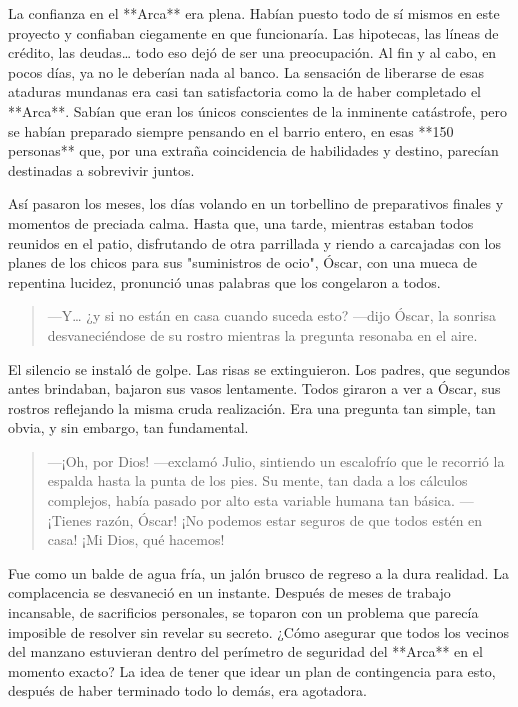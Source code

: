 \documentclass[a4paper,12pt]{book}
\begin{document}
La confianza en el **Arca** era plena. Habían puesto todo de sí mismos en este proyecto y confiaban ciegamente en que funcionaría. Las hipotecas, las líneas de crédito, las deudas… todo eso dejó de ser una preocupación. Al fin y al cabo, en pocos días, ya no le deberían nada al banco. La sensación de liberarse de esas ataduras mundanas era casi tan satisfactoria como la de haber completado el **Arca**. Sabían que eran los únicos conscientes de la inminente catástrofe, pero se habían preparado siempre pensando en el barrio entero, en esas **150 personas** que, por una extraña coincidencia de habilidades y destino, parecían destinadas a sobrevivir juntos.

Así pasaron los meses, los días volando en un torbellino de preparativos finales y momentos de preciada calma. Hasta que, una tarde, mientras estaban todos reunidos en el patio, disfrutando de otra parrillada y riendo a carcajadas con los planes de los chicos para sus "suministros de ocio", Óscar, con una mueca de repentina lucidez, pronunció unas palabras que los congelaron a todos.

\begin{quote}
    —Y… ¿y si no están en casa cuando suceda esto? —dijo Óscar, la sonrisa desvaneciéndose de su rostro mientras la pregunta resonaba en el aire.
\end{quote}

El silencio se instaló de golpe. Las risas se extinguieron. Los padres, que segundos antes brindaban, bajaron sus vasos lentamente. Todos giraron a ver a Óscar, sus rostros reflejando la misma cruda realización. Era una pregunta tan simple, tan obvia, y sin embargo, tan fundamental.

\begin{quote}
    —¡Oh, por Dios! —exclamó Julio, sintiendo un escalofrío que le recorrió la espalda hasta la punta de los pies. Su mente, tan dada a los cálculos complejos, había pasado por alto esta variable humana tan básica. —¡Tienes razón, Óscar! ¡No podemos estar seguros de que todos estén en casa! ¡Mi Dios, qué hacemos!
\end{quote}

Fue como un balde de agua fría, un jalón brusco de regreso a la dura realidad. La complacencia se desvaneció en un instante. Después de meses de trabajo incansable, de sacrificios personales, se toparon con un problema que parecía imposible de resolver sin revelar su secreto. ¿Cómo asegurar que todos los vecinos del manzano estuvieran dentro del perímetro de seguridad del **Arca** en el momento exacto? La idea de tener que idear un plan de contingencia para esto, después de haber terminado todo lo demás, era agotadora.
\end{document}

